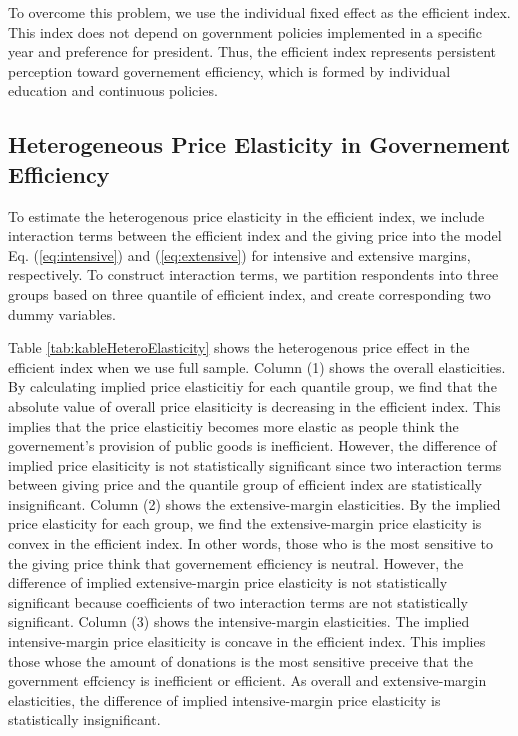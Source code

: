 \documentclass[ review  , 3p ]{elsarticle}
\begin{document}
  To overcome this problem, we use the individual fixed effect as the efficient index.
  This index does not depend on government policies implemented in a specific year and preference for president.
  Thus, the efficient index represents persistent perception toward governement efficiency,
  which is formed by individual education and continuous policies.

  \hypertarget{heterogeneous-price-elasticity-in-governement-efficiency}{%
  \subsection{Heterogeneous Price Elasticity in Governement Efficiency}\label{heterogeneous-price-elasticity-in-governement-efficiency}}

  To estimate the heterogenous price elasticity in the efficient index,
  we include interaction terms between the efficient index and the giving price
  into the model Eq. (\eqref{eq:intensive}) and (\eqref{eq:extensive}) for intensive and extensive margins, respectively.
  To construct interaction terms, we partition respondents into three groups based on three quantile of efficient index,
  and create corresponding two dummy variables.

  Table \ref{tab:kableHeteroElasticity} shows the heterogenous price effect in the efficient index
  when we use full sample.
  Column (1) shows the overall elasticities.
  By calculating implied price elasticitiy for each quantile group,
  we find that the absolute value of overall price elasiticity is decreasing in the efficient index.
  This implies that the price elasticitiy becomes more elastic
  as people think the governement's provision of public goods is inefficient.
  However,
  the difference of implied price elasiticity is not statistically significant
  since two interaction terms between giving price and the quantile group of efficient index are statistically insignificant.
  Column (2) shows the extensive-margin elasticities.
  By the implied price elasticity for each group,
  we find the extensive-margin price elasticity is convex in the efficient index.
  In other words, those who is the most sensitive to the giving price think that
  governement efficiency is neutral.
  However, the difference of implied extensive-margin price elasticity is not statistically significant
  because coefficients of two interaction terms are not statistically significant.
  Column (3) shows the intensive-margin elasticities.
  The implied intensive-margin price elasiticity is concave in the efficient index.
  This implies those whose the amount of donations is the most sensitive preceive that
  the government effciency is inefficient or efficient.
  As overall and extensive-margin elasticities,
  the difference of implied intensive-margin price elasticity is statistically insignificant.
\end{document}
